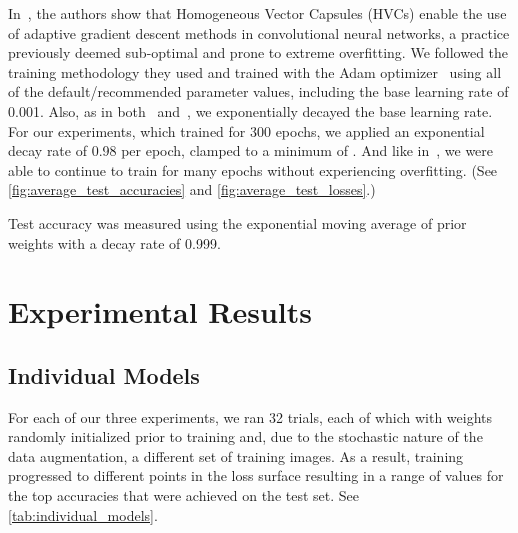 \documentclass{article}
\begin{document}
In~\cite{Byerly2019}, the authors show that Homogeneous Vector Capsules (HVCs) enable the use of adaptive gradient descent methods in convolutional neural networks, a practice previously deemed sub-optimal and prone to extreme overfitting.  We followed the training methodology they used and trained with the Adam optimizer~\cite{Kingma2014} using all of the default/recommended parameter values, including the base learning rate of 0.001.  Also, as in both~\cite{Byerly2019} and~\cite{Sabour2017}, we exponentially decayed the base learning rate.  For our experiments, which trained for 300 epochs, we applied an exponential decay rate of 0.98 per epoch, clamped to a minimum of .  And like in~\cite{Byerly2019}, we were able to continue to train for many epochs without experiencing overfitting. (See \autoref{fig:average_test_accuracies} and \autoref{fig:average_test_losses}.)

Test accuracy was measured using the exponential moving average of prior weights with a decay rate of 0.999.~\cite{Izmailov2018}

\section{Experimental Results}\label{sec:experimental_results}

\subsection{Individual Models}

For each of our three experiments, we ran 32 trials, each of which with weights randomly initialized prior to training and, due to the stochastic nature of the data augmentation, a different set of training images.  As a result, training progressed to different points in the loss surface resulting in a range of values for the top accuracies that were achieved on the test set.  See \autoref{tab:individual_models}.
\end{document}
